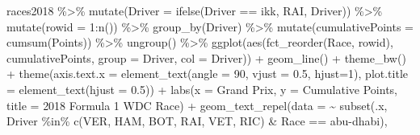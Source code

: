 \documentclass[
]{book}
\newenvironment{Shaded}{\begin{snugshade}}{\end{snugshade}}
\newcommand{\AttributeTok}[1]{\textcolor[rgb]{0.77,0.63,0.00}{#1}}
\newcommand{\DecValTok}[1]{\textcolor[rgb]{0.00,0.00,0.81}{#1}}
\newcommand{\FloatTok}[1]{\textcolor[rgb]{0.00,0.00,0.81}{#1}}
\newcommand{\FunctionTok}[1]{\textcolor[rgb]{0.00,0.00,0.00}{#1}}
\newcommand{\NormalTok}[1]{#1}
\newcommand{\SpecialCharTok}[1]{\textcolor[rgb]{0.00,0.00,0.00}{#1}}
\newcommand{\StringTok}[1]{\textcolor[rgb]{0.31,0.60,0.02}{#1}}
\begin{document}
\begin{Shaded}
\begin{Highlighting}[]
\NormalTok{races2018 }\SpecialCharTok{\%\textgreater{}\%}
  \FunctionTok{mutate}\NormalTok{(}\AttributeTok{Driver =} \FunctionTok{ifelse}\NormalTok{(Driver }\SpecialCharTok{==} \StringTok{\textquotesingle{}ikk\textquotesingle{}}\NormalTok{, }\StringTok{\textquotesingle{}RAI\textquotesingle{}}\NormalTok{, Driver)) }\SpecialCharTok{\%\textgreater{}\%} 
  \FunctionTok{mutate}\NormalTok{(}\AttributeTok{rowid =} \DecValTok{1}\SpecialCharTok{:}\FunctionTok{n}\NormalTok{()) }\SpecialCharTok{\%\textgreater{}\%}
  \FunctionTok{group\_by}\NormalTok{(Driver) }\SpecialCharTok{\%\textgreater{}\%} 
  \FunctionTok{mutate}\NormalTok{(}\AttributeTok{cumulativePoints =} \FunctionTok{cumsum}\NormalTok{(Points)) }\SpecialCharTok{\%\textgreater{}\%}
  \FunctionTok{ungroup}\NormalTok{() }\SpecialCharTok{\%\textgreater{}\%} 
  \FunctionTok{ggplot}\NormalTok{(}\FunctionTok{aes}\NormalTok{(}\FunctionTok{fct\_reorder}\NormalTok{(Race, rowid), cumulativePoints,}
         \AttributeTok{group =}\NormalTok{ Driver, }\AttributeTok{col =}\NormalTok{ Driver)) }\SpecialCharTok{+}
  \FunctionTok{geom\_line}\NormalTok{() }\SpecialCharTok{+}
  \FunctionTok{theme\_bw}\NormalTok{() }\SpecialCharTok{+} 
  \FunctionTok{theme}\NormalTok{(}\AttributeTok{axis.text.x =} \FunctionTok{element\_text}\NormalTok{(}\AttributeTok{angle =} \DecValTok{90}\NormalTok{, }\AttributeTok{vjust =} \FloatTok{0.5}\NormalTok{, }\AttributeTok{hjust=}\DecValTok{1}\NormalTok{),}
        \AttributeTok{plot.title =} \FunctionTok{element\_text}\NormalTok{(}\AttributeTok{hjust =} \FloatTok{0.5}\NormalTok{)) }\SpecialCharTok{+}
  \FunctionTok{labs}\NormalTok{(}\AttributeTok{x =} \StringTok{\textquotesingle{}Grand Prix\textquotesingle{}}\NormalTok{,}
       \AttributeTok{y =} \StringTok{\textquotesingle{}Cumulative Points\textquotesingle{}}\NormalTok{,}
       \AttributeTok{title =} \StringTok{\textquotesingle{}2018 Formula 1 WDC Race\textquotesingle{}}\NormalTok{) }\SpecialCharTok{+}
  \FunctionTok{geom\_text\_repel}\NormalTok{(}\AttributeTok{data =} \SpecialCharTok{\textasciitilde{}} \FunctionTok{subset}\NormalTok{(.x, Driver }\SpecialCharTok{\%in\%} \FunctionTok{c}\NormalTok{(}\StringTok{\textquotesingle{}VER\textquotesingle{}}\NormalTok{, }\StringTok{\textquotesingle{}HAM\textquotesingle{}}\NormalTok{, }\StringTok{\textquotesingle{}BOT\textquotesingle{}}\NormalTok{, }\StringTok{\textquotesingle{}RAI\textquotesingle{}}\NormalTok{, }\StringTok{\textquotesingle{}VET\textquotesingle{}}\NormalTok{, }\StringTok{\textquotesingle{}RIC\textquotesingle{}}\NormalTok{) }\SpecialCharTok{\&}\NormalTok{ Race }\SpecialCharTok{==} \StringTok{\textquotesingle{}abu{-}dhabi\textquotesingle{}}\NormalTok{),}

\end{Highlighting}
\end{Shaded}
\end{document}
